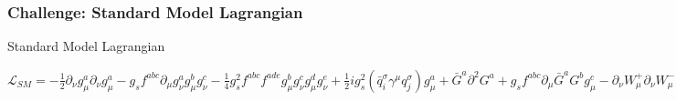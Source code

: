 \begin{frame}[fragile]
\frametitle{Challenge: Standard Model Lagrangian}
\begin{alertblock}{\small Standard Model Lagrangian}
\tiny
\fontsize{3pt}{3.1pt}
\begin{center}
\begin{math}
\mathcal{L}_{SM} = -\frac{1}{2}\partial_{\nu}g^{a}_{\mu}\partial_{\nu}g^{a}_{\mu}
-g_{s}f^{abc}\partial_{\mu}g^{a}_{\nu}g^{b}_{\mu}g^{c}_{\nu}
-\frac{1}{4}g^{2}_{s}f^{abc}f^{ade}g^{b}_{\mu}g^{c}_{\nu}g^{d}_{\mu}g^{e}_{\nu}
+\frac{1}{2}ig^{2}_{s}(\bar{q}^{\sigma}_{i}\gamma^{\mu}q^{\sigma}_{j})g^{a}_{\mu}
+\bar{G}^{a}\partial^{2}G^{a}+g_{s}f^{abc}\partial_{\mu}\bar{G}^{a}G^{b}g^{c}_{\mu}
-\partial_{\nu}W^{+}_{\mu}\partial_{\nu}W^{-}_{\mu}-M^{2}W^{+}_{\mu}W^{-}_{\mu}
-\frac{1}{2}\partial_{\nu}Z^{0}_{\mu}\partial_{\nu}Z^{0}_{\mu}-\frac{1}{2c^{2}_{w}}
M^{2}Z^{0}_{\mu}Z^{0}_{\mu}
-\frac{1}{2}\partial_{\mu}A_{\nu}\partial_{\mu}A_{\nu}
-\frac{1}{2}\partial_{\mu}H\partial_{\mu}H-\frac{1}{2}m^{2}_{h}H^{2}
-\partial_{\mu}\phi^{+}\partial_{\mu}\phi^{-}-M^{2}\phi^{+}\phi^{-}
-\frac{1}{2}\partial_{\mu}\phi^{0}\partial_{\mu}\phi^{0}-\frac{1}{2c^{2}_{w}}M\phi^{0}\phi^{0}
-\beta_{h}[\frac{2M^{2}}{g^{2}}+\frac{2M}{g}H+\frac{1}{2}(H^{2}+\phi^{0}\phi^{0}+2\phi^{+}\phi^{-%
})]+\frac{2M^{4}}{g^{2}}\alpha_{h}
-igc_{w}[\partial_{\nu}Z^{0}_{\mu}(W^{+}_{\mu}W^{-}_{\nu}-W^{+}_{\nu}W^{-}_{\mu})
-Z^{0}_{\nu}(W^{+}_{\mu}\partial_{\nu}W^{-}_{\mu}-W^{-}_{\mu}\partial_{\nu}W^{+}_{\mu})
+Z^{0}_{\mu}(W^{+}_{\nu}\partial_{\nu}W^{-}_{\mu}-W^{-}_{\nu}\partial_{\nu}W^{+}_{\mu})]
-igs_{w}[\partial_{\nu}A_{\mu}(W^{+}_{\mu}W^{-}_{\nu}-W^{+}_{\nu}W^{-}_{\mu})
-A_{\nu}(W^{+}_{\mu}\partial_{\nu}W^{-}_{\mu}-W^{-}_{\mu}\partial_{\nu}W^{+}_{\mu})
+A_{\mu}(W^{+}_{\nu}\partial_{\nu}W^{-}_{\mu}-W^{-}_{\nu}\partial_{\nu}W^{+}_{\mu})]
-\frac{1}{2}g^{2}W^{+}_{\mu}W^{-}_{\mu}W^{+}_{\nu}W^{-}_{\nu}+\frac{1}{2}g^{2}
W^{+}_{\mu}W^{-}_{\nu}W^{+}_{\mu}W^{-}_{\nu}
+g^2c^{2}_{w}(Z^{0}_{\mu}W^{+}_{\mu}Z^{0}_{\nu}W^{-}_{\nu}-Z^{0}_{\mu}Z^{0}_{\mu}W^{+}_{\nu}
W^{-}_{\nu})
+g^2s^{2}_{w}(A_{\mu}W^{+}_{\mu}A_{\nu}W^{-}_{\nu}-A_{\mu}A_{\mu}W^{+}_{\nu}
W^{-}_{\nu})
+g^{2}s_{w}c_{w}[A_{\mu}Z^{0}_{\nu}(W^{+}_{\mu}W^{-}_{\nu}-W^{+}_{\nu}W^{-}_{\mu})-%
2A_{\mu}Z^{0}_{\mu}W^{+}_{\nu}W^{-}_{\nu}]
-g\alpha[H^3+H\phi^{0}\phi^{0}+2H\phi^{+}\phi^{-}]
-\frac{1}{8}g^{2}\alpha_{h}[H^4+(\phi^{0})^{4}+4(\phi^{+}\phi^{-})^{2}+4(\phi^{0})^{2}
\phi^{+}\phi^{-}+4H^{2}\phi^{+}\phi^{-}+2(\phi^{0})^{2}H^{2}]
-gMW^{+}_{\mu}W^{-}_{\mu}H-\frac{1}{2}g\frac{M}{c^{2}_{w}}Z^{0}_{\mu}Z^{0}_{\mu}H
-\frac{1}{2}ig[W^{+}_{\mu}(\phi^{0}\partial_{\mu}\phi^{-}-\phi^{-}\partial_{\mu}\phi^{0})

\end{math}
\end{center}
\end{alertblock}
\end{frame}
